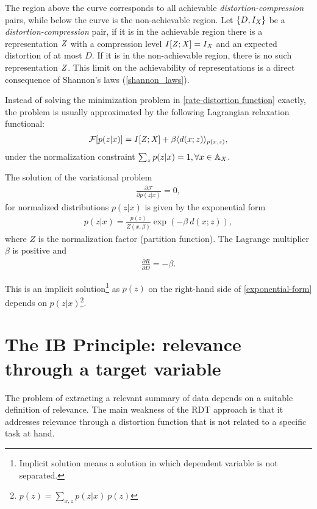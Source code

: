 
The region above the curve corresponds to all achievable \emph{distortion-compression} pairs, while below the curve is the non-achievable region. Let $\{D, I_{{\mathit{X}}}\}$ be a \emph{distortion-compression} pair, if it is in the achievable region there is a representation ${\mathit{Z}}$ with a compression level $I[{\mathit{Z}};{\mathit{X}}]=I_{{\mathit{X}}}$ and an expected distortion of at most $D$. If it is in the non-achievable region, there is no such representation ${\mathit{Z}}$. This limit on the achievability of representations is a direct consequence of Shannon's laws (\ref{shannon_laws}).

Instead of solving the minimization problem in \eqref{rate-distortion function} exactly, the problem is usually approximated by the following Lagrangian relaxation functional:
\begin{align}
	\mathcal{F}[p(z|x)] = I[{\mathit{Z}};{\mathit{X}}] + \beta \langle d(x;z) \rangle_{p(x,z)},
\end{align}
under the normalization constraint $\sum_z p(z|x)=1, \forall x \in {\mathbb{A}}_{{\mathit{X}}}$.

\begin{theorem}\label{thrm:RDT solution}
	The solution of the variational problem~\cite{tishby:1999}
	\begin{align}
		\frac{\partial \mathcal{F}}{\partial p(z|x)}=0,
	\end{align}
	for normalized distributions $p(z|x)$ is given by the exponential form
	\begin{align}
		p(z|x) = \frac{p(z)}{Z(x,\beta)}\exp (-\beta ~d(x;z)),\label{exponential-form}
	\end{align}
	where $Z$ is the normalization factor (partition function).  The Lagrange multiplier $\beta$ is positive and
	\begin{align}
		\frac{\partial R}{\partial D} = - \beta.
	\end{align}
\end{theorem}
This is an implicit solution\footnote{Implicit solution means a solution in which dependent variable is not separated.} as $p(z)$ on the right-hand side of \cref{exponential-form} depends on $p(z|x)$\footnote{$p(z)=\sum_{x,z} p(z|x)~p(z)$}.

\section{The IB Principle: relevance through a target variable}\label{sec:IB_principle}
The problem of extracting a relevant summary of data depends on a suitable definition of relevance. The main weakness of the \ac{RDT} approach is that it addresses relevance through a distortion function that is not related to a specific task at hand.

